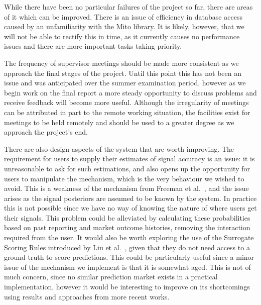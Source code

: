 \documentclass[10pt,a4paper]{article}
\theoremstyle{plain}
\theoremstyle{definition}
\begin{document}
While there have been no particular failures of the project so far, there are
areas of it which can be improved. There is an issue of efficiency in database
access caused by an unfamiliarity with the Mito library. It is likely, however,
that we will not be able to rectify this in time, as it currently causes no
performance issues and there are more important tasks taking priority.

The frequency of supervisor meetings should be made more consistent as we
approach the final stages of the project. Until this point this has not been an
issue and was anticipated over the summer examination period, however as we
begin work on the final report a more steady opportunity to discuss problems
and receive feedback will become more useful. Although the irregularity of
meetings can be attributed in part to the remote working situation, the
facilities exist for meetings to be held remotely and should be used to a
greater degree as we approach the project's end.

There are also design aspects of the system that are worth improving. The
requirement for users to supply their estimates of signal accuracy is an issue:
it is unreasonable to ask for such estimations, and also opens up the
opportunity for users to manipulate the mechanism, which is the very behaviour
we wished to avoid. This is a weakness of the mechanism from Freeman et
al.~\cite{CODiPM}, and the issue arises as the signal posteriors are assumed to
be known by the system. In practice this is not possible since we have no way
of knowing the nature of where users get their signals. This problem could be
alleviated by calculating these probabilities based on past reporting and
market outcome histories, removing the interaction required from the user. It
would also be worth exploring the use of the Surrogate Scoring Rules introduced
by Liu et al.~\cite{Liu2020}, given that they do not need access to a ground
truth to score predictions. This could be particularly useful since a minor
issue of the mechanism we implement is that it is somewhat aged. This is not of
much concern, since no similar prediction market exists in a practical
implementation, however it would be interesting to improve on its shortcomings
using results and approaches from more recent works.




\begin{appendices}

%
%    
%    

\end{appendices}
\end{document}
